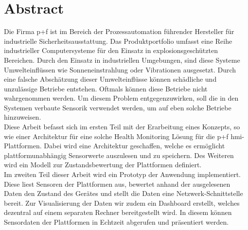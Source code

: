 \chapter*{Abstract}
Die Firma \ac{p+f} ist im Bereich der Prozessautomation führender Hersteller für industrielle Sicherheitsausstattung. Das Produktportfolio umfasst eine Reihe industrieller Computersysteme für den Einsatz in explosionsgeschützten Bereichen. Durch den Einsatz in industriellen Umgebungen, sind diese Systeme Umwelteinflüssen wie Sonneneinstrahlung oder Vibrationen ausgesetzt. Durch eine falsche Abschätzung dieser Umwelteinflüsse können schädliche und unzulässige Betriebe entstehen. Oftmals können diese Betriebe nicht wahrgenommen werden. Um diesem Problem entgegenzuwirken, soll die in den Systemen verbaute Sensorik verwendet werden, um auf eben solche Betriebe hinzuweisen.\\
Diese Arbeit befasst sich im ersten Teil mit der Erarbeitung eines Konzepts, so wie einer Architektur für eine solche Health Monitoring Lösung für die \acl{p+f} \ac{hmi}-Plattformen. Dabei wird eine Architektur geschaffen, welche es ermöglicht plattformunabhängig Sensorwerte auszulesen und zu speichern. Des Weiteren wird ein Modell zur Zustandsbewertung der Plattformen definiert.\\
Im zweiten Teil dieser Arbeit wird ein Prototyp der Anwendung implementiert. Diese liest Sensoren der Plattformen aus, bewertet anhand der ausgelesenen Daten den Zustand des Gerätes und stellt die Daten eine Netzwerk-Schnittstelle bereit.
Zur Visualisierung der Daten wir zudem ein Dashboard erstellt, welches dezentral auf einem separaten Rechner bereitgestellt wird. In diesem können Sensordaten der Plattformen in Echtzeit abgerufen und präsentiert werden. 